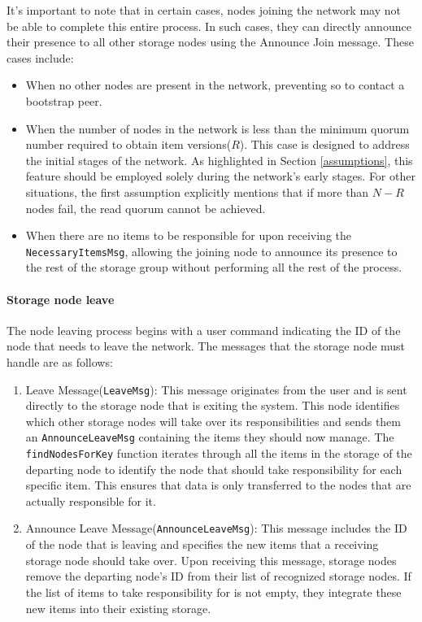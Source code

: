 \documentclass[a4paper, 11pt]{article}
\begin{document}
It's important to note that in certain cases, nodes joining the network may not be able to complete this entire process. In such cases, they can directly announce their presence to all other storage nodes using the Announce Join message. These cases include:

\begin{itemize}
    \item When no other nodes are present in the network, preventing so to contact a bootstrap peer.
    \item When the number of nodes in the network is less than the minimum quorum number required to obtain item versions($R$). This case is designed to address the initial stages of the network. As highlighted in Section \ref{assumptions}, this feature should be employed solely during the network's early stages. For other situations, the first assumption explicitly mentions that if more than $N-R$ nodes fail, the read quorum cannot be achieved.
    \item When there are no items to be responsible for upon receiving the \verb|NecessaryItemsMsg|, allowing the joining node to announce its presence to the rest of the storage group without performing all the rest of the process.
\end{itemize}

\paragraph{Storage node leave} The node leaving process begins with a user command indicating the ID of the node that needs to leave the network. The messages that the storage node must handle are as follows:

\begin{enumerate}
    \item Leave Message(\verb|LeaveMsg|): This message originates from the user and is sent directly to the storage node that is exiting the system. This node identifies which other storage nodes will take over its responsibilities and sends them an \verb|AnnounceLeaveMsg| containing the items they should now manage. The \verb|findNodesForKey| function iterates through all the items in the storage of the departing node to identify the node that should take responsibility for each specific item. This ensures that data is only transferred to the nodes that are actually responsible for it.
    \item Announce Leave Message(\verb|AnnounceLeaveMsg|): This message includes the ID of the node that is leaving and specifies the new items that a receiving storage node should take over. Upon receiving this message, storage nodes remove the departing node's ID from their list of recognized storage nodes. If the list of items to take responsibility for is not empty, they integrate these new items into their existing storage.
\end{enumerate}
\end{document}
